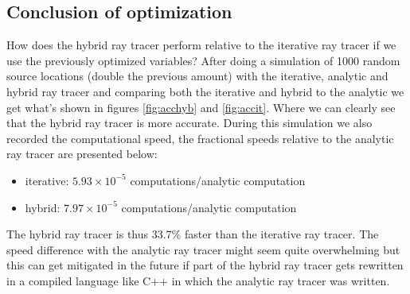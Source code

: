 \subsection{Conclusion of optimization}
How does the hybrid ray tracer perform relative to the iterative ray tracer if we use 
the previously optimized variables? After doing a simulation of 1000 random source locations (double the previous amount) with
the iterative, analytic and hybrid ray tracer and comparing both the iterative and hybrid to the analytic 
we get what's shown in figures \ref{fig:acchyb} and \ref{fig:accit}. Where we can clearly see that the hybrid
ray tracer is more accurate. During this simulation we also recorded the computational speed, the fractional
speeds relative to the analytic ray tracer are presented below:
\begin{itemize}
	\item iterative: $5.93 \times 10^{-5}$ computations/analytic computation
	\item hybrid: $7.97 \times 10^{-5}$ computations/analytic computation
\end{itemize}
The hybrid ray tracer is thus 33.7\% faster than the iterative ray
tracer. The speed difference with the analytic ray tracer might seem
quite overwhelming but this can get mitigated in the future if part
of the hybrid ray tracer gets rewritten in a compiled language
like C++ in which the analytic ray tracer was written.

